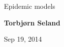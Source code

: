 \documentclass[%
twoside,                 %
final,                   %
10pt]{article}
\begin{document}




\thispagestyle{empty}

\begin{center}
{\LARGE\bf
\begin{spacing}{1.25}
Epidemic models
\end{spacing}
}
\end{center}


\begin{center}
{\bf Torbjørn Seland${}^{}$} \\ [0mm]
\end{center}

    \begin{center}
\end{center}


\begin{center}
Sep 19, 2014
\end{center}

\vspace{1cm}


\tableofcontents


\vspace{1cm} %
\end{document}
